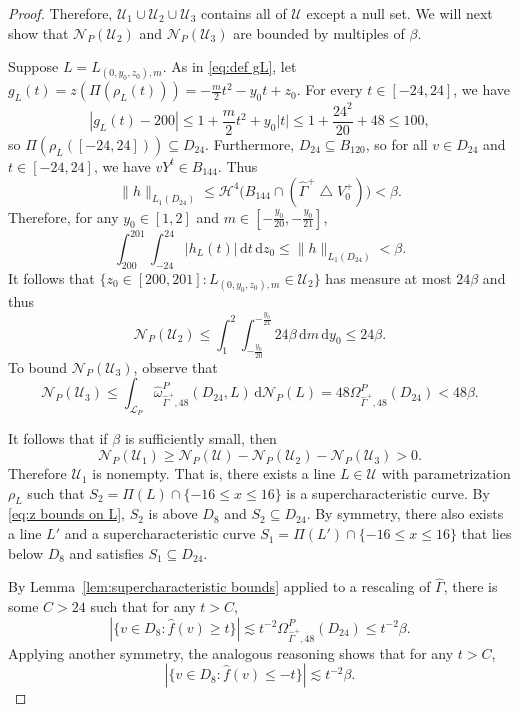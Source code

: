 \documentclass[11pt,reqno]{amsart}
\newcommand{\wwidehat}[1]{\widehat{#1}}
\newcommand{\cH}{\mathcal{H}}
\newcommand{\cL}{\mathcal{L}}
\newcommand{\cN}{\mathcal{N}}
\newcommand{\cU}{\mathcal{U}}
\newcommand{\ud}[0]{\,\mathrm{d}}
\newcommand{\0}{\mathbf{0}}
\renewcommand{\1}{\mathbf 1}
\newcommand{\symdiff}{\mathbin{\triangle}}
\renewcommand{\mid}{:}
\renewcommand{\subset}{\subseteq}
\renewcommand{\ge}{\geqslant}
\renewcommand{\le}{\leqslant}
\theoremstyle{remark}
\begin{document}
\begin{proof}
  Therefore, $\cU_1\cup \cU_2 \cup \cU_3$ contains all of $\cU$ except a null set.  We will next show that $\cN_P(\cU_2)$ and $\cN_P(\cU_3)$ are bounded by multiples of $\beta$.

  Suppose $L=L_{(0,y_0,z_0),m}$.  As in \eqref{eq:def gL}, let $g_L(t)=z(\Pi(\rho_L(t)))=-\frac{m}{2} t^2- y_0 t + z_0$.  For every $t\in [-24,24]$, we have
  \begin{equation}\label{eq:z bounds on L}
    |g_L(t)-200|\le 1+\frac{m}{2} t^2 + y_0 |t|\le 1+\frac{24^2}{20}+48\le 100,
  \end{equation}
  so $\Pi(\rho_L([-24,24]))\subset D_{24}$.  Furthermore, $D_{24}\subset B_{120}$, so for all $v\in D_{24}$ and $t\in [-24,24]$, we have $vY^t\in B_{144}$.  Thus
  \begin{equation}\label{eq:clipped f bounds}
    \|h\|_{L_1(D_{24})}\le \cH^4\big(B_{144}\cap (\hat{\Gamma}^+\symdiff V_0^+)\big)<\beta.
  \end{equation}
  Therefore, for any $y_0\in [1,2]$ and $m \in \left[-\frac{y_0}{20}, -\frac{y_0}{21}\right]$,
  $$\int_{200}^{201} \int_{-24}^{24} |h_L(t)|\ud t \ud z_0 \le \|h\|_{L_1(D_{24})}<\beta.$$
  It follows that $\{ z_0\in [200,201] \mid L_{(0,y_0,z_0),m}\in \cU_2\}$ has measure at most $24 \beta$ and thus
  $$\cN_P(\cU_2)\le \int_1^2\int_{-\frac{y_0}{20}}^{-\frac{y_0}{21}} 24 \beta \ud m \ud y_0\le 24 \beta.$$
  To bound $\cN_P(\cU_3)$, observe that
  $$\cN_P(\cU_3)\le \int_{\cL_P} \wwidehat{\omega}^P_{\hat{\Gamma}^+,48}(D_{24},L)\ud \cN_P(L)=48 \Omega^P_{\hat{\Gamma}^+,48}(D_{24})<48 \beta.$$

  It follows that if $\beta$ is sufficiently small, then
  $$\cN_P(\cU_1)\ge \cN_P(\cU)-\cN_P(\cU_2)-\cN_P(\cU_3)>0.$$
  Therefore $\cU_1$ is nonempty.  That is, there exists a line $L\in \cU$ with parametrization $\rho_L$ such that $S_2=\Pi(L)\cap \{-16\le x\le 16\}$ is a supercharacteristic curve.  By \eqref{eq:z bounds on L}, $S_2$ is above $D_8$ and $S_2\subset D_{24}$.  By symmetry, there  also exists a line $L'$ and a supercharacteristic curve $S_1=\Pi(L')\cap \{-16\le x\le 16\}$ that lies below $D_8$ and satisfies $S_1\subset D_{24}$.

  By Lemma~\ref{lem:supercharacteristic bounds} applied to a rescaling of $\hat{\Gamma}$, there is some $C>24$ such that for any $t>C$,
  $$|\{v\in D_8\mid \hat{f}(v)\ge t\}| \lesssim t^{-2} \Omega^P_{\hat{\Gamma}^+,48}(D_{24})\le t^{-2} \beta.$$
  Applying another symmetry, the analogous reasoning shows that for any $t>C$,
  $$|\{v\in D_8\mid \hat{f}(v)\le -t\}| \lesssim t^{-2}\beta.$$



\end{proof}
\end{document}
